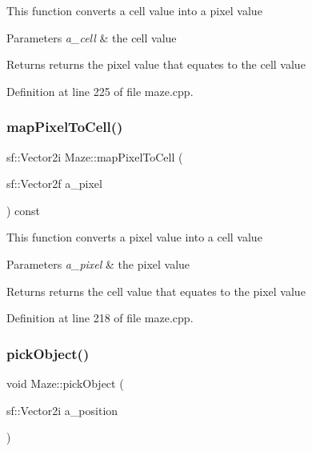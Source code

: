 This function converts a cell value into a pixel value


\begin{DoxyParams}{Parameters}
{\em a\+\_\+cell} & the cell value \\
\hline
\end{DoxyParams}
\begin{DoxyReturn}{Returns}
returns the pixel value that equates to the cell value 
\end{DoxyReturn}


Definition at line 225 of file maze.\+cpp.

\mbox{\label{class_maze_a6e9ed602dba392b5aaf8b694f5aa6197}} 
\subsubsection{\texorpdfstring{map\+Pixel\+To\+Cell()}{mapPixelToCell()}}
{\footnotesize\ttfamily sf\+::\+Vector2i Maze\+::map\+Pixel\+To\+Cell (\begin{DoxyParamCaption}\item[{sf\+::\+Vector2f}]{a\+\_\+pixel }\end{DoxyParamCaption}) const}

This function converts a pixel value into a cell value


\begin{DoxyParams}{Parameters}
{\em a\+\_\+pixel} & the pixel value \\
\hline
\end{DoxyParams}
\begin{DoxyReturn}{Returns}
returns the cell value that equates to the pixel value 
\end{DoxyReturn}


Definition at line 218 of file maze.\+cpp.

\mbox{\label{class_maze_aff24b90af3ab6bd16c94b6831052d3db}} 
\subsubsection{\texorpdfstring{pick\+Object()}{pickObject()}}
{\footnotesize\ttfamily void Maze\+::pick\+Object (\begin{DoxyParamCaption}\item[{sf\+::\+Vector2i}]{a\+\_\+position }\end{DoxyParamCaption})}

